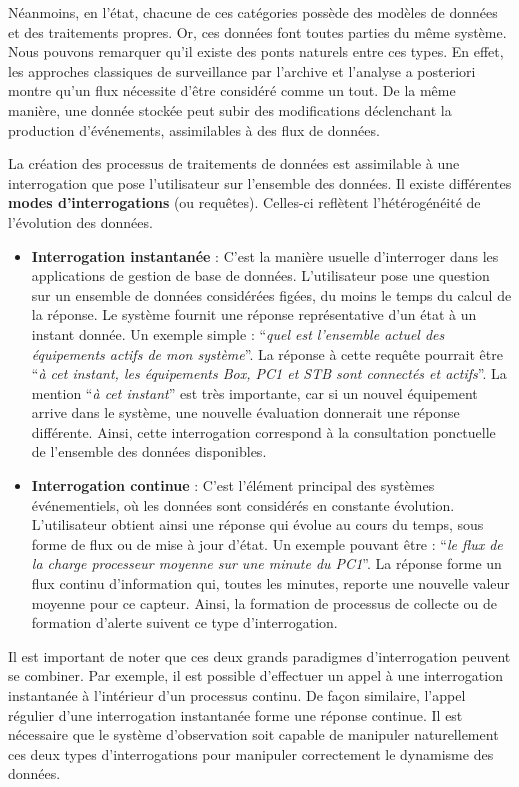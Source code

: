 Néanmoins, en l'état, chacune de ces catégories possède des modèles de données et des traitements propres. Or, ces données font toutes parties du même système. Nous pouvons remarquer qu'il existe des ponts naturels entre ces types. En effet, les approches classiques de surveillance par l'archive et l'analyse a posteriori montre qu'un flux nécessite d'être considéré comme un tout. De la même manière, une donnée stockée peut subir des modifications déclenchant la production d'événements, assimilables à des flux de données.

La création des processus de traitements de données est assimilable à une interrogation que pose l'utilisateur sur l'ensemble des données. Il existe différentes \textbf{modes d'interrogations} (ou requêtes). Celles-ci reflètent l'hétérogénéité de l'évolution des données.
\begin{itemize}
    \item \textbf{Interrogation instantanée} : C'est la manière usuelle d'interroger dans les applications de gestion de base de données. L'utilisateur pose une question sur un ensemble de données considérées figées, du moins le temps du calcul de la réponse. Le système fournit une réponse représentative d'un état à un instant donnée. Un exemple simple : \enquote{\it quel est l'ensemble actuel des équipements actifs de mon système}. La réponse à cette requête pourrait être \enquote{\it à cet instant, les équipements Box, PC1 et STB sont connectés et actifs}. La mention \enquote{\it à cet instant} est très importante, car si un nouvel équipement arrive dans le système, une nouvelle évaluation donnerait une réponse différente. Ainsi, cette interrogation correspond à la consultation ponctuelle de l'ensemble des données disponibles.
    \item \textbf{Interrogation continue} : C'est l'élément principal des systèmes événementiels, où les données sont considérés en constante évolution. L'utilisateur obtient ainsi une réponse qui évolue au cours du temps, sous forme de flux ou de mise à jour d'état. Un exemple pouvant être : \enquote{\it le flux de la charge processeur moyenne sur une minute du PC1}. La réponse forme un flux continu d'information qui, toutes les minutes, reporte une nouvelle valeur moyenne pour ce capteur. Ainsi, la formation de processus de collecte ou de formation d'alerte suivent ce type d'interrogation.
\end{itemize}

Il est important de noter que ces deux grands paradigmes d'interrogation peuvent se combiner. Par exemple, il est possible d'effectuer un appel à une interrogation instantanée à l'intérieur d'un processus continu. De façon similaire, l'appel régulier d'une interrogation instantanée forme une réponse continue. Il est nécessaire que le système d'observation soit capable de manipuler naturellement ces deux types d'interrogations pour manipuler correctement le dynamisme des données.

